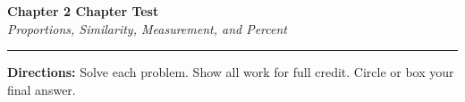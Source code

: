 \documentclass[11pt]{article}
\begin{document}
\begin{center}
  {\Large\textbf{Chapter 2 Chapter Test}}\\[4pt]
  \textit{Proportions, Similarity, Measurement, and Percent}
\end{center}

\vspace{0.2cm}
\hrule
\vspace{0.3cm}

\textbf{Directions:} Solve each problem. Show all work for full credit.
Circle or box your final answer.
\end{document}
